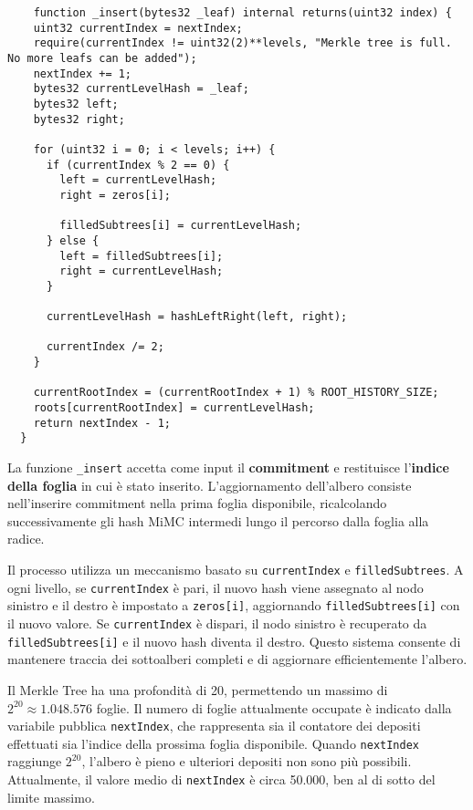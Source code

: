 \begin{lstlisting}
    function _insert(bytes32 _leaf) internal returns(uint32 index) {
    uint32 currentIndex = nextIndex;
    require(currentIndex != uint32(2)**levels, "Merkle tree is full. No more leafs can be added");
    nextIndex += 1;
    bytes32 currentLevelHash = _leaf;
    bytes32 left;
    bytes32 right;

    for (uint32 i = 0; i < levels; i++) {
      if (currentIndex % 2 == 0) {
        left = currentLevelHash;
        right = zeros[i];

        filledSubtrees[i] = currentLevelHash;
      } else {
        left = filledSubtrees[i];
        right = currentLevelHash;
      }

      currentLevelHash = hashLeftRight(left, right);

      currentIndex /= 2;
    }

    currentRootIndex = (currentRootIndex + 1) % ROOT_HISTORY_SIZE;
    roots[currentRootIndex] = currentLevelHash;
    return nextIndex - 1;
  }
\end{lstlisting}

La funzione \texttt{\_insert} accetta come input il \textbf{commitment} e restituisce l'\textbf{indice della foglia} in cui è stato inserito. L'aggiornamento dell'albero consiste nell'inserire commitment nella prima foglia disponibile, ricalcolando successivamente gli hash MiMC intermedi lungo il percorso dalla foglia alla radice.

Il processo utilizza un meccanismo basato su \texttt{currentIndex} e \texttt{filledSubtrees}. A ogni livello, se \texttt{currentIndex} è pari, il nuovo hash viene assegnato al nodo sinistro e il destro è impostato a \texttt{zeros[i]}, aggiornando \texttt{filledSubtrees[i]} con il nuovo valore. Se \texttt{currentIndex} è dispari, il nodo sinistro è recuperato da \texttt{filledSubtrees[i]} e il nuovo hash diventa il destro. Questo sistema consente di mantenere traccia dei sottoalberi completi e di aggiornare efficientemente l'albero.

Il Merkle Tree ha una profondità di 20, permettendo un massimo di \(2^{20} \approx 1.048.576\) foglie. Il numero di foglie attualmente occupate è indicato dalla variabile pubblica \texttt{nextIndex}, che rappresenta sia il contatore dei depositi effettuati sia l'indice della prossima foglia disponibile. Quando \texttt{nextIndex} raggiunge \(2^{20}\), l'albero è pieno e ulteriori depositi non sono più possibili. Attualmente, il valore medio di \texttt{nextIndex} è circa 50.000, ben al di sotto del limite massimo.


